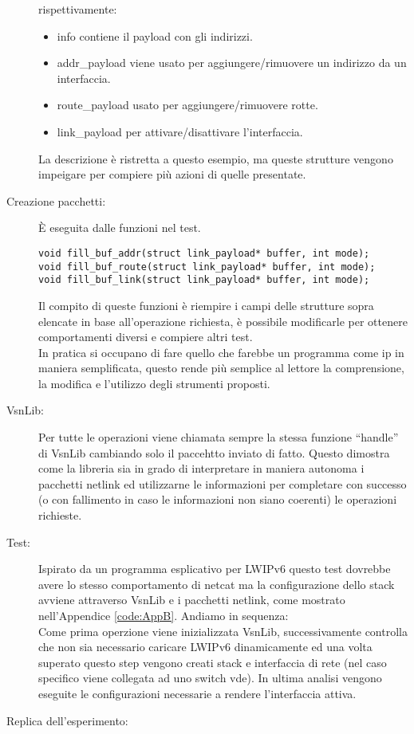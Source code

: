 \begin{description}
\begin{lstlisting}[style=CStyle]
\end{lstlisting}
rispettivamente:
\begin{itemize}
  \item info contiene il payload con gli indirizzi.
  \item addr\_payload viene usato per aggiungere/rimuovere un indirizzo da un interfaccia.
  \item route\_payload usato per aggiungere/rimuovere rotte.
  \item link\_payload per attivare/disattivare l'interfaccia.
\end{itemize}
La descrizione \`e ristretta a questo esempio, ma queste strutture vengono impeigare per compiere pi\`u azioni di quelle presentate.
\item[Creazione pacchetti: ]\`E eseguita dalle funzioni nel test.
\begin{lstlisting}[style=CStyle]
void fill_buf_addr(struct link_payload* buffer, int mode);
void fill_buf_route(struct link_payload* buffer, int mode);
void fill_buf_link(struct link_payload* buffer, int mode);
\end{lstlisting}
Il compito di queste funzioni \`e riempire i campi delle strutture sopra elencate in base all'operazione richiesta, \`e possibile modificarle per ottenere comportamenti diversi e compiere altri test.\\
In pratica si occupano di fare quello che farebbe un programma come ip in maniera semplificata, questo rende pi\`u semplice al lettore la comprensione, la modifica e l'utilizzo degli strumenti proposti.
\item[VsnLib: ]Per tutte le operazioni viene chiamata sempre la stessa funzione ``handle'' di VsnLib cambiando solo il paccehtto inviato di fatto. Questo dimostra come la libreria sia in grado di interpretare in maniera autonoma i pacchetti netlink ed utilizzarne le informazioni per completare con successo (o con fallimento in caso le informazioni non siano coerenti) le operazioni richieste.
\item[Test: ]Ispirato da un programma esplicativo per LWIPv6 questo test dovrebbe avere lo stesso comportamento di netcat ma la configurazione dello stack avviene attraverso VsnLib e i pacchetti netlink, come mostrato nell'Appendice \ref{code:AppB}.
Andiamo in sequenza:\\
Come prima operzione viene inizializzata VsnLib, successivamente controlla che non sia necessario caricare LWIPv6 dinamicamente ed una volta superato questo step vengono creati stack e interfaccia di rete (nel caso specifico viene collegata ad uno switch vde). In ultima analisi vengono eseguite le configurazioni necessarie a rendere l'interfaccia attiva.
\item[Replica dell'esperimento: ]
\end{description}
\clearpage{\pagestyle{empty}\cleardoublepage}
